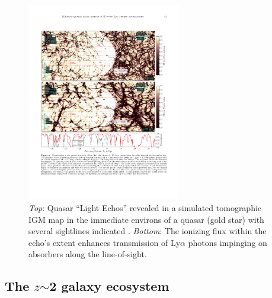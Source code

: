 \begin{figure}
%
\includegraphics[width=0.6\textwidth]{figs/qso_LightEcho_v1.pdf}
%
\caption{{\it Top}: Quasar ``Light Echos'' revealed in a simulated
tomographic IGM map in the immediate environs of a quasar (gold star)
with several sightlines indicated
\citep[from][]{2018arXiv181005156S}. {\it Bottom}: The ionizing flux
within the echo's extent enhances transmission of Ly$\alpha$ photons
impinging on absorbers along the line-of-sight.}
\label{fig:LightEcho}
\end{figure}


\subsection{The $z$$\sim$2 galaxy ecosystem}
\label{sec:z2galaxies}

